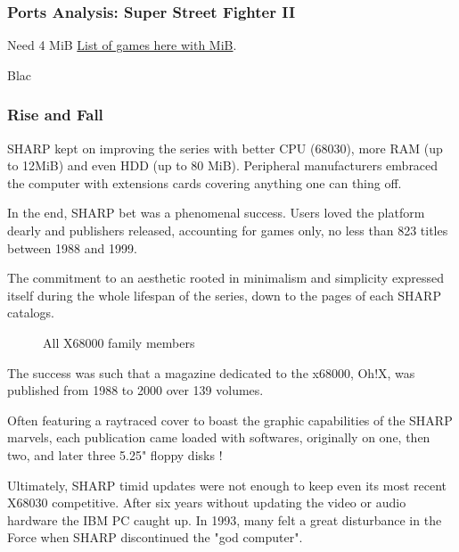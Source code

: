 

\subsubsection{Ports Analysis: Super Street Fighter II}
Need 4 MiB \href{http://tkhr000.s601.xrea.com/x68softlist/x68soft.htm}{List of games here with MiB}.

\pagebreak

Blac

\pagebreak


\subsubsection{Rise and Fall}
 SHARP kept on improving the series with better CPU (68030), more RAM (up to 12MiB) and even HDD (up to 80 MiB). Peripheral manufacturers embraced the computer with extensions cards covering anything one can thing off. 

 In the end, SHARP bet was a phenomenal success. Users loved the platform dearly and publishers released, accounting for games only, no less than 823 titles between 1988 and 1999.



The commitment to an aesthetic rooted in minimalism and simplicity expressed itself during the whole lifespan of the series, down to the pages of each SHARP catalogs. 


 \begin{figure}[H]
\caption*{All X68000 family members}
\end{figure}

\begin{trivia}
The success was such that a magazine dedicated to the x68000, Oh!X, was published from 1988 to 2000 over 139 volumes. 


\begin{minipage}[t]{0.32\linewidth}
\end{minipage}%
\hfill
\begin{minipage}[t]{0.32\linewidth}
\end{minipage}%
\hfill
\begin{minipage}[t]{0.322\linewidth}
\end{minipage}%



Often featuring a raytraced cover to boast the graphic capabilities of the SHARP marvels, each publication came loaded with softwares, originally on one, then two, and later three 5.25" floppy disks \cite{ohXarticle}!
\end{trivia}

Ultimately, SHARP timid updates were not enough to keep even its most recent X68030 competitive. After six years without updating the video or audio hardware the IBM PC caught up. In 1993, many felt a great disturbance in the Force when SHARP discontinued the "god computer".

